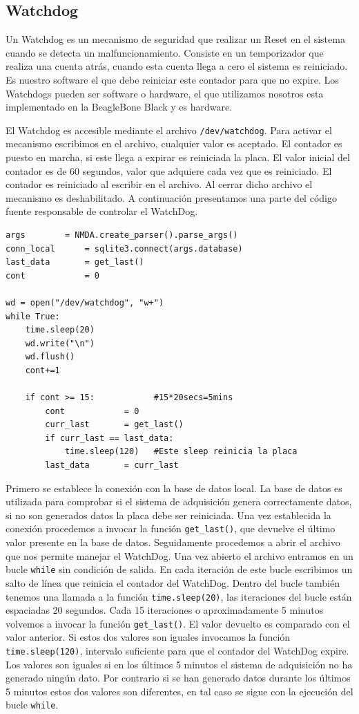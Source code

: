	\subsection{Watchdog}
		Un Watchdog \cite{WatchDogWiki} es un mecanismo de seguridad que realizar un Reset en el sistema cuando se detecta un
		malfuncionamiento. Consiste en un temporizador que realiza una cuenta atrás, cuando esta cuenta llega a cero el sistema es reiniciado.
		Es nuestro software el que debe reiniciar este contador para que no expire. Los Watchdogs pueden ser software o hardware, el que
		utilizamos nosotros esta implementado en la BeagleBone Black y es hardware.
		\par
		El Watchdog es accesible mediante el archivo \texttt{/dev/watchdog}. Para activar el mecanismo escribimos en el archivo, cualquier
		valor es aceptado. El contador es puesto en marcha, si este llega a expirar es reiniciada la placa. El valor inicial del contador es
		de 60 segundos, valor que adquiere cada vez que es reiniciado. El contador es reiniciado al escribir en el archivo. Al cerrar dicho
		archivo el mecanismo es deshabilitado. A continuación presentamos una parte del código fuente responsable de controlar el WatchDog.
		\begin{lstlisting}[style=myPython]
args		= NMDA.create_parser().parse_args()
conn_local      = sqlite3.connect(args.database)
last_data       = get_last()
cont            = 0

wd = open("/dev/watchdog", "w+")
while True:
    time.sleep(20)
    wd.write("\n")
    wd.flush()
    cont+=1

    if cont >= 15:            #15*20secs=5mins
        cont            = 0
        curr_last       = get_last()
        if curr_last == last_data:
            time.sleep(120)   #Este sleep reinicia la placa
        last_data       = curr_last
		\end{lstlisting}
		Primero se establece la conexión con la base de datos local. La base de datos es utilizada para comprobar si el sistema de adquisición
		genera correctamente datos, si no son generados datos la placa debe ser reiniciada. Una vez establecida la conexión procedemos a
		invocar la función \texttt{get\_last()}, que devuelve el último valor presente en la base de datos. Seguidamente procedemos a abrir el
		archivo  que nos permite manejar el WatchDog. Una vez abierto el archivo entramos en un bucle \texttt{while} sin condición de salida.
		En cada iteración de este bucle escribimos un salto de línea que reinicia el contador del WatchDog. Dentro del bucle también tenemos
		una llamada a la función \texttt{time.sleep(20)}, las iteraciones del bucle están espaciadas 20 segundos. Cada 15 iteraciones o
		aproximadamente 5 minutos volvemos a invocar la función \texttt{get\_last()}. El valor devuelto es comparado con el valor anterior. Si
		estos dos valores son iguales invocamos la función \texttt{time.sleep(120)}, intervalo suficiente para que el contador del WatchDog
		expire. Los valores son iguales si en los últimos 5 minutos el sistema de adquisición no ha generado ningún dato. Por contrario si se
		han generado datos durante los últimos 5 minutos estos dos valores son diferentes, en tal caso se sigue con la ejecución del bucle
		\texttt{while}. 
